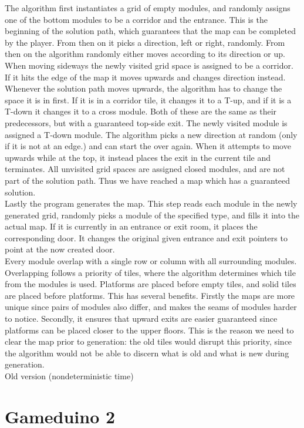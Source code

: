 The algorithm first instantiates a grid of empty modules, and randomly assigns one of the bottom modules to be a corridor and the entrance. This is the beginning of the solution path, which guarantees that the map can be completed by the player. From then on it picks a direction, left or right, randomly. From then on the algorithm randomly either moves according to its direction or up. When moving sideways the newly visited grid space is assigned to be a corridor. If it hits the edge of the map it moves upwards and changes direction instead. Whenever the solution path moves upwards, the algorithm has to change the space it is in first. If it is in a corridor tile, it changes it to a T-up, and if it is a T-down it changes it to a cross module. Both of these are the same as their predecessors, but with a guaranteed top-side exit. The newly visited module is assigned a T-down module. The algorithm picks a new direction at random (only if it is not at an edge.) and can start the over again. When it attempts to move upwards while at the top, it instead places the exit in the current tile and terminates. All unvisited grid spaces are assigned closed modules, and are not part of the solution path. Thus we have reached a map which has a guaranteed solution.\\
Lastly the program generates the map. This step reads each module in the newly generated grid, randomly picks a module of the specified type, and fills it into the actual map. If it is currently in an entrance or exit room, it places the corresponding door. It changes the original given entrance and exit pointers to
point at the now created door.\\
Every module overlap with a single row or column with all surrounding modules. Overlapping follows a priority of tiles, where the algorithm determines which tile from the modules is used. Platforms are placed before empty tiles, and solid tiles are placed before platforms. This has several benefits. Firstly the maps are more unique since pairs of modules also differ, and makes the seams of modules harder to notice. Secondly, it ensures that upward exits are easier guaranteed since platforms can be placed closer to the upper floors. This is the reason we need to clear the map prior to generation: the old tiles would disrupt this priority, since the algorithm would not be able to discern what is old and what is new during
generation.\\
Old version (nondeterministic time)

\section{Gameduino 2}
